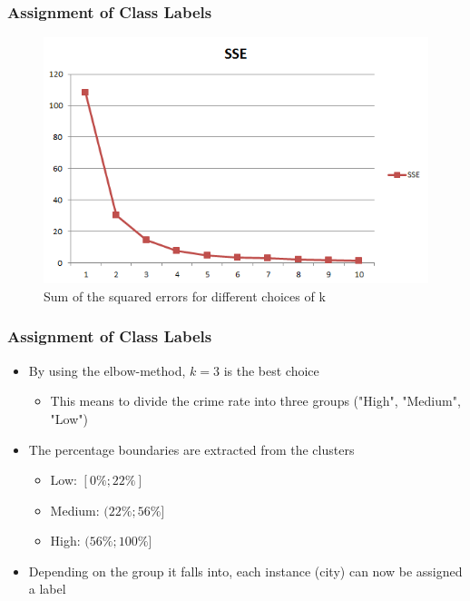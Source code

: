 \begin{frame}
  \frametitle{Assignment of Class Labels}
  \begin{figure}[H]
    \centering
    \includegraphics[width=0.8\columnwidth]{../../charts/SSE.png}
    \caption{Sum of the squared errors for different choices of k}
    \label{fig:sse}
  \end{figure}
\end{frame}

\begin{frame}
  \frametitle{Assignment of Class Labels}
  \begin{itemize}
    \item By using the elbow-method, \(k=3\) is the best choice
      \begin{itemize}
        \item This means to divide the crime rate into three groups ("High", "Medium", "Low")
      \end{itemize}
    \item The percentage boundaries are extracted from the clusters
      \begin{itemize}
        \item Low: \([0\%; 22\%]\) 
	\item Medium: \((22\%; 56\%]\)
	\item High: \((56\%; 100\%]\)
      \end{itemize}
    \item Depending on the group it falls into, each instance (city) can now be assigned a label
  \end{itemize}
\end{frame}

